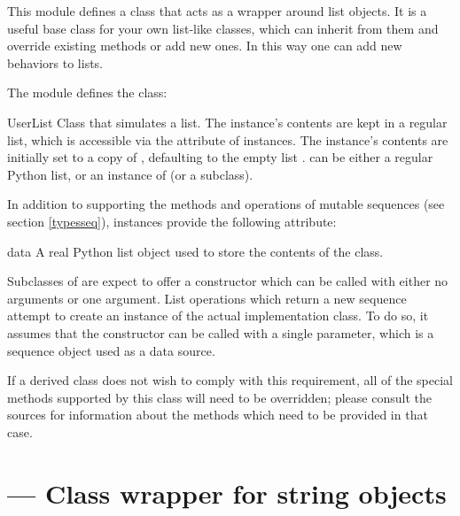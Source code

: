 This module defines a class that acts as a wrapper around
list objects.  It is a useful base class for
your own list-like classes, which can inherit from
them and override existing methods or add new ones.  In this way one
can add new behaviors to lists.

The  module defines the  class:

\begin{classdesc}{UserList}{}
Class that simulates a list.  The instance's
contents are kept in a regular list, which is accessible via the
 attribute of  instances.  The instance's
contents are initially set to a copy of , defaulting to the
empty list \code{[]}.   can be either a regular Python list,
or an instance of  (or a subclass).
\end{classdesc}

In addition to supporting the methods and operations of mutable
sequences (see section \ref{typesseq}),  instances
provide the following attribute:

\begin{memberdesc}{data}
A real Python list object used to store the contents of the
 class.
\end{memberdesc}

Subclasses of  are expect to offer a constructor which
can be called with either no arguments or one argument.  List
operations which return a new sequence attempt to create an instance
of the actual implementation class.  To do so, it assumes that the
constructor can be called with a single parameter, which is a sequence
object used as a data source.

If a derived class does not wish to comply with this requirement, all
of the special methods supported by this class will need to be
overridden; please consult the sources for information about the
methods which need to be provided in that case.



\section{ ---
         Class wrapper for string objects}

